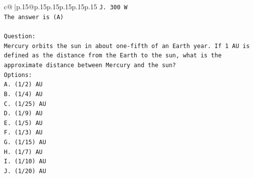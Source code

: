 \documentclass{article}
\begin{document}
{\begin{supertabular}{c@{$\;$}|p{.15\linewidth}@{}p{.15\linewidth}p{.15\linewidth}p{.15\linewidth}p{.15\linewidth}p{.15\linewidth}}
{{{\texttt{J. 300 W} \\
\texttt{The answer is (A)} \\
\\ 
\texttt{Question:} \\
\texttt{Mercury orbits the sun in about one{-}fifth of an Earth year. If 1 AU is defined as the distance from the Earth to the sun, what is the approximate distance between Mercury and the sun?} \\
\texttt{Options:} \\
\texttt{A. (1/2) AU} \\
\texttt{B. (1/4) AU} \\
\texttt{C. (1/25) AU} \\
\texttt{D. (1/9) AU} \\
\texttt{E. (1/5) AU} \\
\texttt{F. (1/3) AU} \\
\texttt{G. (1/15) AU} \\
\texttt{H. (1/7) AU} \\
\texttt{I. (1/10) AU} \\
\texttt{J. (1/20) AU} \\
            }
        }
    }
     \\ \\


\end{supertabular}}
\end{document}
